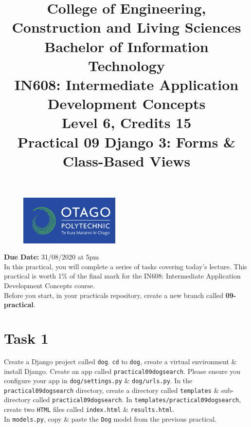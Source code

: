 \documentclass{article}
\author{}
\begin{document}
\begin{figure}
	\centering
	\includegraphics[width=50mm]{./img/logo.png}
\end{figure}

\title{College of Engineering, Construction and Living Sciences\\Bachelor of Information Technology\\IN608: Intermediate Application Development Concepts\\Level 6, Credits 15\\\textbf{Practical 09 Django 3: Forms \& Class-Based Views}} 
\date{}
\maketitle

\textbf{Due Date:} 31/08/2020 at 5pm \\

In this practical, you will complete a series of tasks covering today's lecture. This practical is worth 1\% of the final mark for the IN608: Intermediate Application Development Concepts course. \\

Before you start, in your practicals repository, create a new branch called \textbf{09-practical}.

\section*{Task 1} 
Create a Django project called \texttt{dog}. \texttt{cd} to \texttt{dog}, create a virtual environment \& install Django. Create an app called \texttt{practical09dogsearch}. Please ensure you configure your app in \texttt{dog/settings.py} \& \texttt{dog/urls.py}. In the \texttt{practical09dogsearch} directory, create a directory called \texttt{templates} \& sub-directory called \texttt{practical09dogsearch}. In \texttt{templates/practical09dogsearch}, create two \texttt{HTML} files called \texttt{index.html} \& \texttt{results.html}. \\

In \texttt{models.py}, copy \& paste the \texttt{Dog} model from the previous practical. \\
\end{document}
